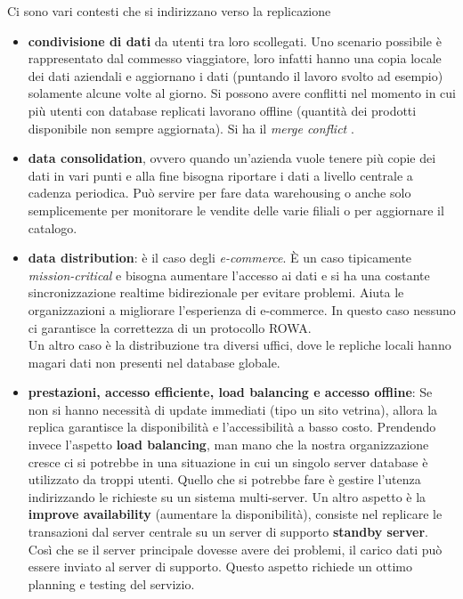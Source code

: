 Ci sono vari contesti che si indirizzano verso la replicazione
\begin{itemize}
    \item \textbf{condivisione di dati} da utenti tra loro scollegati. Uno scenario possibile è rappresentato dal commesso viaggiatore, loro infatti hanno una copia locale dei dati aziendali e aggiornano i dati (puntando il lavoro svolto ad esempio) solamente alcune volte al giorno. Si possono avere conflitti nel momento in cui più utenti con database replicati lavorano offline (quantità dei prodotti disponibile non sempre aggiornata). Si ha il \textit{merge conflict} .
    
    \item \textbf{data consolidation}, ovvero quando un'azienda vuole tenere più copie dei dati in vari punti e alla fine bisogna riportare i dati a livello centrale a cadenza periodica. Può servire per fare data warehousing o anche solo semplicemente per monitorare le vendite delle varie filiali o per aggiornare il catalogo.
    
    \item \textbf{data distribution}: è il caso degli \textit{e-commerce}. È un caso tipicamente \textit{mission-critical} e bisogna aumentare l'accesso ai dati e si ha una costante sincronizzazione realtime bidirezionale per evitare problemi. Aiuta le organizzazioni a migliorare l'esperienza di e-commerce. In questo caso nessuno ci garantisce la correttezza di un protocollo ROWA.\\
    Un altro caso è la distribuzione tra diversi uffici, dove le repliche locali hanno magari dati non presenti nel database globale.
    
    \item \textbf{prestazioni, accesso efficiente, load balancing e accesso offline}: Se non si hanno necessità di update immediati (tipo un sito vetrina), allora la replica garantisce la disponibilità e l'accessibilità a basso costo. Prendendo invece l'aspetto \textbf{load balancing}, man mano che la nostra organizzazione cresce ci si potrebbe in una situazione in cui un singolo server database è utilizzato da troppi utenti. Quello che si potrebbe fare è gestire l'utenza indirizzando le richieste su un sistema multi-server. Un altro aspetto è la \textbf{improve availability} (aumentare la disponibilità), consiste nel replicare le transazioni dal server centrale su un server di supporto \textbf{standby server}. Così che se il server principale dovesse avere dei problemi, il carico dati può essere inviato al server di supporto. Questo aspetto richiede un ottimo planning e testing del servizio.  
    

\end{itemize}
